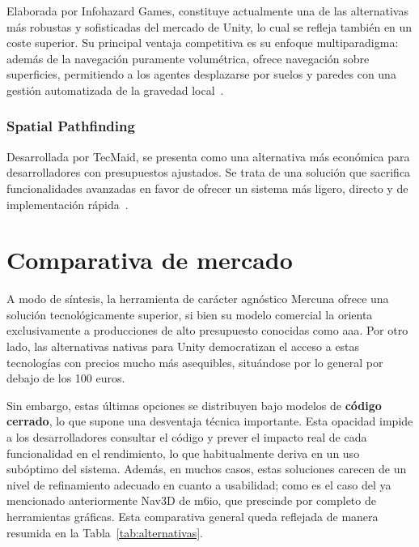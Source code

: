 Elaborada por Infohazard Games, constituye actualmente una de las alternativas más robustas y sofisticadas del mercado de Unity, lo cual se refleja también en un coste superior.
Su principal ventaja competitiva es su enfoque multiparadigma: además de la navegación puramente volumétrica, ofrece navegación sobre superficies, permitiendo a los agentes desplazarse por suelos y paredes con una gestión automatizada de la gravedad local~\cite{HyperNav3D}.

\subsubsection{Spatial Pathfinding}

Desarrollada por TecMaid, se presenta como una alternativa más económica para desarrolladores con presupuestos ajustados.
Se trata de una solución que sacrifica funcionalidades avanzadas en favor de ofrecer un sistema más ligero, directo y de implementación rápida~\cite{SpatialPathfinding3D}.

\section{Comparativa de mercado}

A modo de síntesis, la herramienta de carácter agnóstico Mercuna ofrece una solución tecnológicamente superior, si bien su modelo comercial la orienta exclusivamente a producciones de alto presupuesto conocidas como \gls{aaa}.
Por otro lado, las alternativas nativas para Unity democratizan el acceso a estas tecnologías con precios mucho más asequibles, situándose por lo general por debajo de los 100 euros.

Sin embargo, estas últimas opciones se distribuyen bajo modelos de \textbf{código cerrado}, lo que supone una desventaja técnica importante.
Esta opacidad impide a los desarrolladores consultar el código y prever el impacto real de cada funcionalidad en el rendimiento, lo que habitualmente deriva en un uso subóptimo del sistema.
Además, en muchos casos, estas soluciones carecen de un nivel de refinamiento adecuado en cuanto a usabilidad; como es el caso del ya mencionado anteriormente Nav3D de m6io, que prescinde por completo de herramientas gráficas.
Esta comparativa general queda reflejada de manera resumida en la Tabla~\ref{tab:alternativas}.

